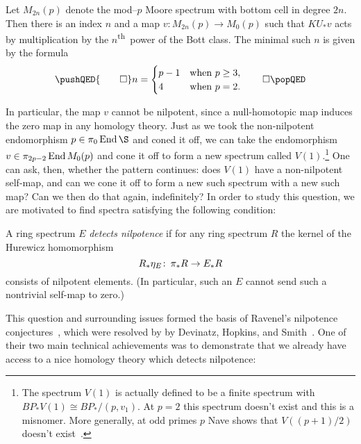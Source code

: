 \begin{theorem}\label{AdamsSelfMapThm}
Let $M_{2n}(p)$ denote the mod--$p$ Moore spectrum with bottom cell in degree $2n$.  Then there is an index $n$ and a map $v: M_{2n}(p) \to M_0(p)$ such that $KU_* v$ acts by multiplication by the $n$\textsuperscript{th}\, power of the Bott class.  The minimal such $n$ is given by the formula
\[
\pushQED{\qed}
n = \begin{cases} p-1 & \text{when $p \ge 3$}, \\ 4 & \text{when $p = 2$}. \end{cases}
\qedhere
\popQED
\]
\end{theorem}

\noindent In particular, the map $v$ cannot be nilpotent, since a null-homotopic map induces the zero map in any homology theory.  Just as we took the non-nilpotent endomorphism $p \in \pi_0 \End \S$ and coned it off, we can take the endomorphism $v \in \pi_{2p-2} \operatorname{End} M_0(p)$ and cone it off to form a new spectrum called $V(1)$.\footnote{The spectrum $V(1)$ is actually defined to be a finite spectrum with $BP_* V(1) \cong BP_* / (p, v_1)$. At $p = 2$ this spectrum doesn't exist and this is a misnomer.  More generally, at odd primes $p$ Nave shows that $V((p+1)/2)$ doesn't exist~\cite[Theorem 1.3]{Nave}.}  One can ask, then, whether the pattern continues: does $V(1)$ have a non-nilpotent self-map, and can we cone it off to form a new such spectrum with a new such map?  Can we then do that again, indefinitely?  In order to study this question, we are motivated to find spectra satisfying the following condition:

\begin{definition}
A ring spectrum $E$ \textit{detects nilpotence} if for any ring spectrum $R$ the kernel of the Hurewicz homomorphism \[R_*\eta_E\colon\thinspace \pi_* R \to E_* R\] consists of nilpotent elements.  (In particular, such an $E$ cannot send such a nontrivial self-map to zero.)
\end{definition}

This question and surrounding issues formed the basis of Ravenel's nilpotence conjectures~\cite[Section 10]{RavenelLocalizationWRTPeriodic}, which were resolved by by Devinatz, Hopkins, and Smith~\cite{DHS,HopkinsSmith}.  One of their two main technical achievements was to demonstrate that we already have access to a nice homology theory which detects nilpotence:

